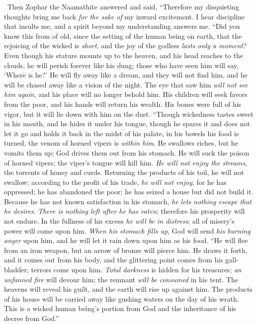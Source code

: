 \begin{biblechapter} %
  Then Zophar the Naamathite answered and said,
\verse “Therefore my disquieting thoughts bring me back 
\textit{for the sake of} my inward excitement.
\verse I hear discipline that insults me, 
and a spirit beyond my understanding answers me.
\verse “Did you know this from of old, 
since the setting of the human being on earth,
\verse that the rejoicing of the wicked is \textit{short}, 
and the joy of the godless \textit{lasts only a moment}?
\verse Even though his stature mounts up to the heaven, 
and his head reaches to the clouds,
\verse he will perish forever like his dung; 
those who have seen him will say, ‘Where is he?’
\verse He will fly away like a dream, and they will not find him, 
and he will be chased away like a vision of the night.
\verse The eye that saw him \textit{will not see him again}, 
and his place will no longer behold him.
\verse His children will seek favors from the poor, 
and his hands will return his wealth.
\verse His bones were full of his vigor, 
but it will lie down with him on the dust.
\verse “Though wickedness tastes sweet in his mouth, 
and he hides it under his tongue,
\verse though he spares it and does not let it go 
and holds it back in the midst of his palate,
\verse in his bowels his food is turned, 
the venom of horned vipers is \textit{within him}.
\verse He swallows riches, but he vomits them up; 
God drives them out from his stomach.
\verse He will suck the poison of horned vipers; 
the viper’s tongue will kill him.
\verse \textit{He will not enjoy the streams}, 
the torrents of honey and curds.
\verse Returning the products of his toil, he will not swallow; 
according to the profit of his trade, \textit{he will not enjoy},
\verse for he has oppressed; he has abandoned the poor; 
he has seized a house but did not build it.
\verse Because he has not known satisfaction in his stomach, 
\textit{he lets nothing escape that he desires}.
\verse \textit{There is nothing left after he has eaten}; 
therefore his prosperity will not endure.
\verse In the fullness of his excess \textit{he will be in distress}; 
all of misery’s power will come upon him.
\verse \textit{When his stomach fills up}, God will send \textit{his burning anger} upon him, 
and he will let it rain down upon him as his food.
\verse “He will flee from an iron weapon, 
but an arrow of bronze will pierce him.
\verse He draws it forth, and it comes out from his body, 
and the glittering point comes from his gall-bladder; 
terrors come upon him.
\verse \textit{Total darkness} is hidden for his treasures; 
\textit{an unfanned fire} will devour him; 
the remnant \textit{will be consumed} in his tent.
\verse The heavens will reveal his guilt, 
and the earth will rise up against him.
\verse The products of his house will be carried away 
like gushing waters on the day of his wrath.
\verse This is a wicked human being’s portion from God 
and the inheritance of his decree from God.”
\end{biblechapter}

